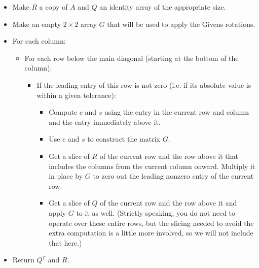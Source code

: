 \begin{itemize}[$\bullet$]

\item Make $R$ a copy of $A$ and $Q$ an identity array of the appropriate size.

\item Make an empty $2 \times 2$ array $G$ that will be used to apply the Givens rotations.

\item For each column:

  \begin{itemize}[$\bullet$]

  \item For each row below the main diagonal (starting at the bottom of the column):

    \begin{itemize}[$\bullet$]

    \item If the leading entry of this row is not zero (i.e. if its absolute value is within a given tolerance):

      \begin{itemize}[$\bullet$]

      \item Compute $c$ and $s$ using the entry in the current row and column and the entry immediately above it.

      \item Use $c$ and $s$ to construct the matrix $G$.

      \item Get a slice of $R$ of the current row and the row above it that includes the columns from the current column onward.
      Multiply it in place by $G$ to zero out the leading nonzero entry of the current row.

      \item Get a slice of $Q$ of the current row and the row above it and apply $G$ to it as well. (Strictly speaking, you do not need to operate over these entire rows, but the slicing needed to avoid the extra computation is a little more involved, so we will not include that here.)

      \end{itemize}

    \end{itemize}

  \end{itemize}

\item Return $Q^T$ and $R$.

\end{itemize}

